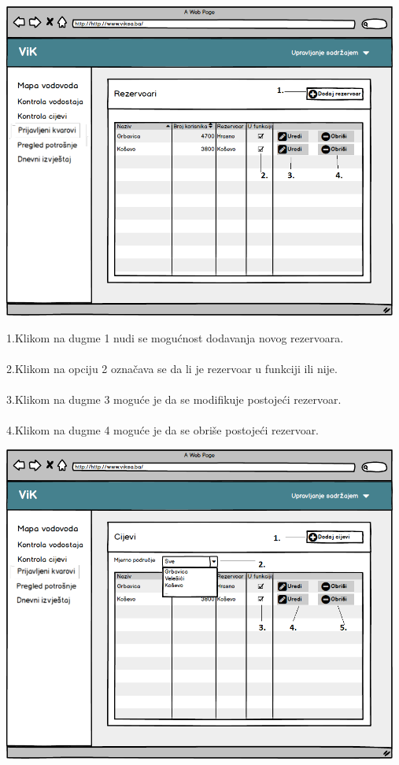 \documentclass[]{report}
\begin{document}
\begin{center}
\includegraphics[width=13cm]{UI4.png}
\end{center}

1.Klikom na dugme 1 nudi se mogućnost dodavanja novog rezervoara.
\\
\\
2.Klikom na opciju 2 označava se da li je rezervoar u funkciji ili nije.
\\
\\
3.Klikom na dugme 3 moguće je da se modifikuje postojeći rezervoar.
\\
\\
4.Klikom na dugme 4 moguće je da se obriše postojeći rezervoar.

\begin{center}
\includegraphics[width=13cm]{UI2.png}
\end{center}
\end{document}

